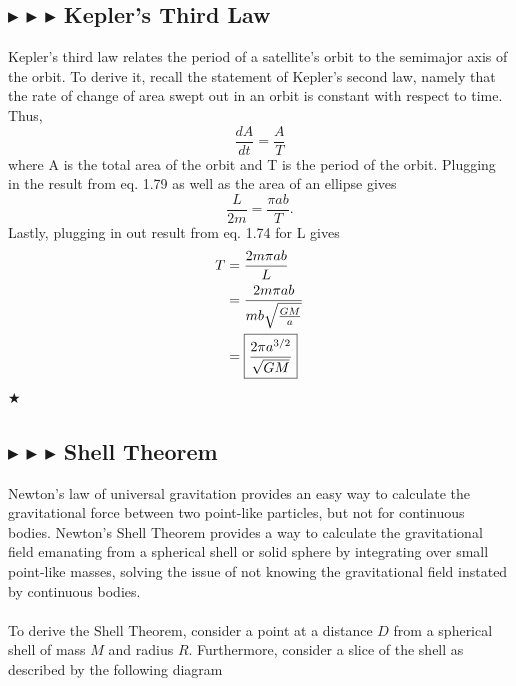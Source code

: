 %
%
\subsection{\color{PineGreen} $\blacktriangleright$ \color{Goldenrod} $\blacktriangleright$ \color{Orchid} $\blacktriangleright$ \color{black} Kepler's Third Law}\label{1.5.4}
Kepler's third law relates the period of a satellite's orbit to the semimajor axis of the orbit. To derive it, recall the statement of Kepler's second law, namely that the rate of change of area swept out in an orbit is constant with respect to time. Thus, 
\begin{equation}
    \frac{dA}{dt} = \frac{A}{T}
\end{equation}
\noindent where A is the total area of the orbit and T is the period of the orbit. Plugging in the result from eq. 1.79 as well as the area of an ellipse gives
\begin{equation*}
    \frac{L}{2m} = \frac{\pi ab}{T}.
\end{equation*}
\noindent Lastly, plugging in out result from eq. 1.74 for L gives
\begin{align}
    T &= \frac{2m\pi ab}{L} \nonumber \\
    &= \frac{2m\pi ab}{mb\sqrt{\frac{GM}{a}}} \nonumber \\
    &= \boxed{\frac{2\pi a^{3/2}}{\sqrt{GM}}}
\end{align}
$\bigstar$

%
%
\subsection{\color{PineGreen} $\blacktriangleright$ \color{Goldenrod} $\blacktriangleright$ \color{Orchid} $\blacktriangleright$ \color{black} Shell Theorem}\label{1.5.5}
Newton's law of universal gravitation provides an easy way to calculate the gravitational force between two point-like particles, but not for continuous bodies. Newton's Shell Theorem provides a way to calculate the gravitational field emanating from a spherical shell or solid sphere by integrating over small point-like masses, solving the issue of not knowing the gravitational field instated by continuous bodies. \\
\\
\noindent To derive the Shell Theorem, consider a point at a distance $D$ from a spherical shell of mass $M$ and radius $R$. Furthermore, consider a slice of the shell as described by the following diagram 

